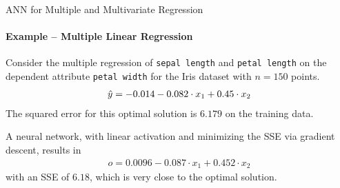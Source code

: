 %
%
%
%
%
%
\begin{frame}{ANN for Multiple and Multivariate Regression}
\framesubtitle{Example -- Multiple Linear Regression}
Consider the multiple regression of {\tt sepal length} and {\tt petal
length} on the dependent attribute {\tt petal width} for the Iris
dataset with $n=150$ points. 
   \begin{align*}
       \hat{y} = -0.014 -0.082 \cdot x_{1} + 0.45\cdot x_{2}
\end{align*}
    The squared error for this optimal solution is $6.179$ on the
    training data.

	\medskip

	A neural network,%
with linear activation
and minimizing the SSE via gradient descent,
results in %
\begin{align*}
    o = 0.0096 - 0.087 \cdot x_{1} + 0.452 \cdot x_{2}
\end{align*}
with an SSE of $6.18$, which is very close to the optimal
solution. 
\end{frame}

